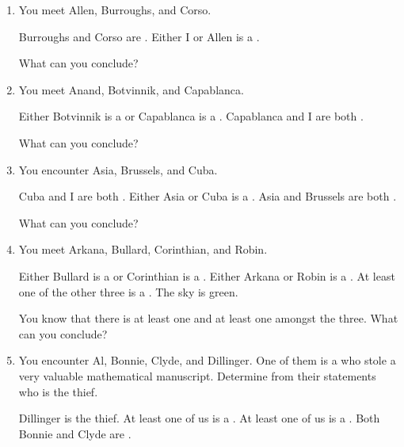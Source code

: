 \probsec{~\ref{sec:conjunctions}}
\begin{enumerate}
    \item You meet Allen, Burroughs, and Corso.
  \begin{dialogue}
     Burroughs and Corso are  \knights.
     Either I or Allen is a \knave.
  \end{dialogue}
  What can you conclude?

    \item You meet Anand, Botvinnik, and Capablanca.
  \begin{dialogue}
     Either Botvinnik is a \knave or Capablanca is a \knight.
     Capablanca and I are both \knaves.
  \end{dialogue}
  What can you conclude?

    \item You encounter Asia, Brussels, and Cuba.
  \begin{dialogue}
     Cuba and I are both \knights.
     Either Asia or Cuba is a \knave.
     Asia and Brussels are both \knaves.
  \end{dialogue}
  What can you conclude?

  \item You meet Arkana, Bullard, Corinthian, and Robin.
  \begin{dialogue}
     Either Bullard is a \knight or Corinthian is a \knave.
     Either Arkana or Robin is a \knave.
     At least one of the other three is a \knave.
     The sky is green.
  \end{dialogue}
  You know that there is at least one \knight and at least one \knave amongst the three. What can you conclude?

  \item You encounter Al, Bonnie, Clyde, and Dillinger. One of them is a \knave who stole a very valuable mathematical manuscript. Determine from their statements who is the thief.
  \begin{dialogue}
     Dillinger is the thief.
     At least one of us is a \knight.
     At least one of us is a \knave.
     Both Bonnie and Clyde are \knights.
  \end{dialogue}

\end{enumerate}
